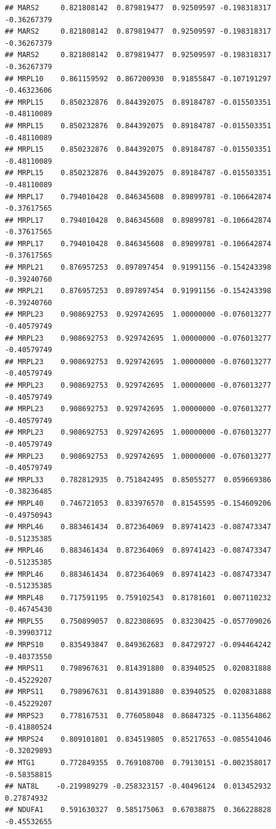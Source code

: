 \documentclass[
]{article}
\begin{document}
\begin{verbatim}
## MARS2     0.821808142  0.879819477  0.92509597 -0.198318317 -0.36267379
## MARS2     0.821808142  0.879819477  0.92509597 -0.198318317 -0.36267379
## MARS2     0.821808142  0.879819477  0.92509597 -0.198318317 -0.36267379
## MRPL10    0.861159592  0.867200930  0.91855847 -0.107191297 -0.46323606
## MRPL15    0.850232876  0.844392075  0.89184787 -0.015503351 -0.48110089
## MRPL15    0.850232876  0.844392075  0.89184787 -0.015503351 -0.48110089
## MRPL15    0.850232876  0.844392075  0.89184787 -0.015503351 -0.48110089
## MRPL15    0.850232876  0.844392075  0.89184787 -0.015503351 -0.48110089
## MRPL17    0.794010428  0.846345608  0.89899781 -0.106642874 -0.37617565
## MRPL17    0.794010428  0.846345608  0.89899781 -0.106642874 -0.37617565
## MRPL17    0.794010428  0.846345608  0.89899781 -0.106642874 -0.37617565
## MRPL21    0.876957253  0.897897454  0.91991156 -0.154243398 -0.39240760
## MRPL21    0.876957253  0.897897454  0.91991156 -0.154243398 -0.39240760
## MRPL23    0.908692753  0.929742695  1.00000000 -0.076013277 -0.40579749
## MRPL23    0.908692753  0.929742695  1.00000000 -0.076013277 -0.40579749
## MRPL23    0.908692753  0.929742695  1.00000000 -0.076013277 -0.40579749
## MRPL23    0.908692753  0.929742695  1.00000000 -0.076013277 -0.40579749
## MRPL23    0.908692753  0.929742695  1.00000000 -0.076013277 -0.40579749
## MRPL23    0.908692753  0.929742695  1.00000000 -0.076013277 -0.40579749
## MRPL23    0.908692753  0.929742695  1.00000000 -0.076013277 -0.40579749
## MRPL33    0.782812935  0.751842495  0.85055277  0.059669386 -0.38236485
## MRPL40    0.746721053  0.833976570  0.81545595 -0.154609206 -0.49750943
## MRPL46    0.883461434  0.872364069  0.89741423 -0.087473347 -0.51235385
## MRPL46    0.883461434  0.872364069  0.89741423 -0.087473347 -0.51235385
## MRPL46    0.883461434  0.872364069  0.89741423 -0.087473347 -0.51235385
## MRPL48    0.717591195  0.759102543  0.81781601  0.007110232 -0.46745430
## MRPL55    0.750899057  0.822308695  0.83230425 -0.057709026 -0.39903712
## MRPS10    0.835493847  0.849362683  0.84729727 -0.094464242 -0.40373550
## MRPS11    0.798967631  0.814391880  0.83940525  0.020831888 -0.45229207
## MRPS11    0.798967631  0.814391880  0.83940525  0.020831888 -0.45229207
## MRPS23    0.778167531  0.776058048  0.86847325 -0.113564862 -0.41880524
## MRPS24    0.809101801  0.834519805  0.85217653 -0.085541046 -0.32029893
## MTG1      0.772849355  0.769108700  0.79130151 -0.002358017 -0.58358815
## NAT8L    -0.219989279 -0.258323157 -0.40496124  0.013452932  0.27874932
## NDUFA1    0.591630327  0.585175063  0.67038875  0.366228828 -0.45532655

\end{verbatim}
\end{document}

